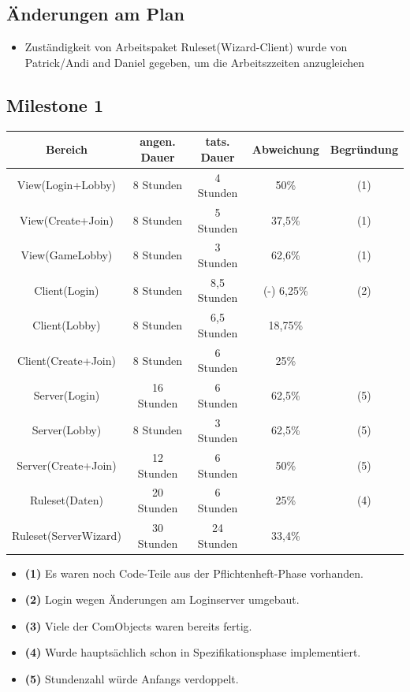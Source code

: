 \documentclass{article}
\begin{document}
\subsection{Änderungen am Plan}
\begin{itemize}
\item Zuständigkeit von Arbeitspaket Ruleset(Wizard-Client) wurde von Patrick/Andi and Daniel gegeben, um die Arbeitszzeiten anzugleichen
\end{itemize}

\subsection{Milestone 1}

\begin{tabular}{|c|c|c|c|c|}\hline
   Bereich & angen. Dauer & tats. Dauer & Abweichung & Begründung \\ \hline\hline
   View(Login+Lobby) & 8 Stunden & 4 Stunden & 50\% & (1) \\ \hline
   View(Create+Join) & 8 Stunden & 5 Stunden & 37,5\% & (1)\\ \hline
   View(GameLobby) & 8 Stunden & 3 Stunden & 62,6\% & (1)\\ \hline
   Client(Login) & 8 Stunden & 8,5 Stunden & (-) 6,25\% & (2) \\ \hline
   Client(Lobby) & 8 Stunden &  6,5 Stunden & 18,75\% &\\ \hline
   Client(Create+Join) &  8 Stunden & 6 Stunden & 25\% &\\ \hline
   Server(Login) & 16 Stunden & 6 Stunden & 62,5\% & (5) \\ \hline
   Server(Lobby) & 8 Stunden & 3 Stunden & 62,5\% & (5)\\ \hline 
   Server(Create+Join) & 12 Stunden & 6 Stunden & 50\% & (5)\\ \hline 
   Ruleset(Daten) & 20 Stunden & 6 Stunden & 25\% & (4) \\ \hline 
   Ruleset(ServerWizard) & 30 Stunden & 24 Stunden & 33,4\% &\\ \hline 
 \end{tabular}

\begin{itemize}
	\item \textbf{(1)} Es waren noch Code-Teile aus der Pflichtenheft-Phase vorhanden. \\
	\item \textbf{(2)} Login wegen Änderungen am Loginserver umgebaut. \\
	\item \textbf{(3)} Viele der ComObjects waren bereits fertig. \\
	\item \textbf{(4)} Wurde hauptsächlich schon in Spezifikationsphase implementiert. \\
	\item \textbf{(5)} Stundenzahl würde Anfangs verdoppelt. \\
\end{itemize}
\end{document}
